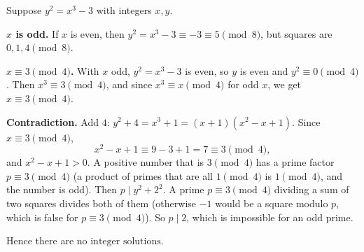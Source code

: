 Suppose $y^2=x^3-3$ with integers $x,y$.

\textbf{$x$ is odd.} If $x$ is even, then $y^2=x^3-3\equiv-3\equiv5\pmod 8$, but squares are $0,1,4\pmod 8$.

\textbf{$x\equiv3\pmod4$.} With $x$ odd, $y^2=x^3-3$ is even, so $y$ is even and $y^2\equiv0\pmod4$. Then $x^3\equiv3\pmod4$, and since $x^3\equiv x\pmod4$ for odd $x$, we get $x\equiv3\pmod4$.

\textbf{Contradiction.} Add $4$: $y^2+4=x^3+1=(x+1)(x^2-x+1)$. Since $x\equiv3\pmod4$,
\[
x^2-x+1\equiv9-3+1=7\equiv3\pmod4,
\]
and $x^2-x+1>0$. A positive number that is $3\pmod4$ has a prime factor $p\equiv3\pmod4$ (a product of primes that are all $1\pmod 4$ is $1\pmod4$, and the number is odd). Then $p\mid y^2+2^2$. A prime $p\equiv3\pmod4$ dividing a sum of two squares divides both of them (otherwise $-1$ would be a square modulo $p$, which is false for $p\equiv3\pmod4$). So $p\mid2$, which is impossible for an odd prime.

Hence there are $\boxed{\text{no integer solutions}}$.
